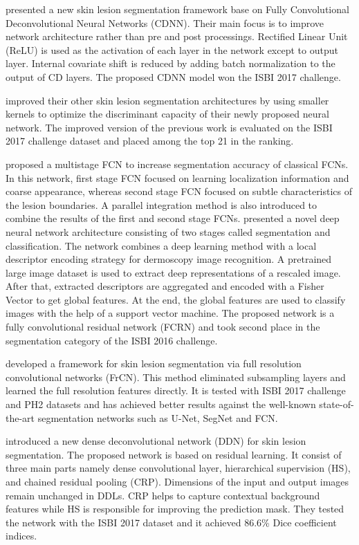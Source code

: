     \citet{yuan2017automatic2} presented a new skin lesion segmentation framework base on Fully Convolutional Deconvolutional Neural Networks (CDNN).
    Their main focus is to improve network architecture rather than pre and post processings.
    Rectified Linear Unit (ReLU) is used as the activation of each layer in the network except to output layer.
    Internal covariate shift is reduced by adding batch normalization to the output of CD layers.
    The proposed CDNN model won the ISBI 2017 challenge.

    \citet{yuan2017improving} improved their other skin lesion segmentation architectures by using smaller kernels to optimize the discriminant capacity of their newly proposed neural network.
    The improved version of the previous work is evaluated on the ISBI 2017 challenge dataset and placed among the top 21 in the ranking.

    \citet{bi2017dermoscopic} proposed a multistage FCN to increase segmentation accuracy of classical FCNs.
    In this network, first stage FCN focused on learning localization information and coarse appearance,
    whereas second stage FCN focused on subtle characteristics of the lesion boundaries.
    A parallel integration method is also introduced to combine the results of the first and second stage FCNs.
    \citet{yu2018melanoma} presented a novel deep neural network architecture  consisting of two stages called segmentation and classification.
    The network combines a deep learning method with a local descriptor encoding strategy for dermoscopy image recognition.
    A pretrained large image dataset is used to extract deep representations of a rescaled image.
    After that, extracted descriptors are aggregated and encoded with a Fisher Vector to get global features.
    At the end, the global features are used to classify images with the help of a support vector machine.
    The proposed network is a fully convolutional residual network (FCRN) and took second place in the segmentation category of the ISBI 2016 challenge.

    \citet{al2018skin} developed a framework for skin lesion segmentation via full resolution convolutional networks (FrCN).
    This method eliminated subsampling layers and learned the full resolution features directly.
    It is tested with ISBI 2017 challenge and PH2 datasets and has achieved better results against the well-known state-of-the-art segmentation networks such as U-Net, SegNet and FCN.

    \citet{li2018dense} introduced a new dense deconvolutional network (DDN) for skin lesion segmentation.
    The proposed network is based on residual learning. It consist of three main parts namely dense convolutional layer, hierarchical supervision (HS), and chained residual pooling (CRP).
    Dimensions of the input and output images remain unchanged in DDLs.
    CRP helps to capture contextual background features while HS is responsible for improving the prediction mask.
    They tested the network with the ISBI 2017 dataset and it achieved 86.6\% Dice coefficient indices.


